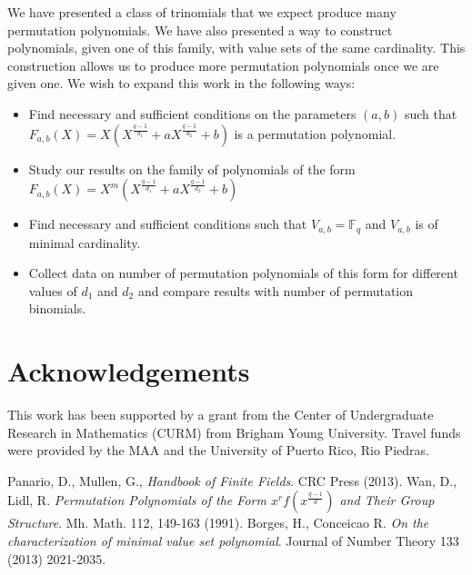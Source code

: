 \documentclass{article}
\theoremstyle{definition}
\theoremstyle{remark}
\numberwithin{equation}{section}
\begin{document}
    We have presented a class of trinomials that we expect produce many permutation polynomials. We have also presented a way to construct polynomials, given one of this family, with value sets of the same cardinality. This construction allows us to produce more permutation polynomials once we are given one. We wish to expand this work in the following ways:
    \begin{itemize}
    \item Find necessary and sufficient conditions on the parameters $(a,b)$ such that $F_{a,b}(X) = X(X^{\frac{q-1}{d_1}} + aX^{\frac{q-1}{d_2}} +b)$ is a permutation polynomial.
    \item Study our results on the family of polynomials of the form $F_{a,b}(X) = X^m(X^{\frac{q-1}{d_1}} + aX^{\frac{q-1}{d_2}} +b)$
    \item Find necessary and sufficient conditions such that $V_{a,b} = \mathbb{F}_q$ and $V_{a,b}$ is of minimal cardinality.
    \item Collect data on number of permutation polynomials of this form for different values of $d_1$ and $d_2$ and compare results with number of permutation binomials.
  \end{itemize}

\section{Acknowledgements}

  This work has been supported by a grant from the Center of Undergraduate Research in Mathematics (CURM) from Brigham Young University. Travel funds were provided by the MAA and the University of Puerto Rico, Rio Piedras.
 
\begin{thebibliography}{}
       Panario, D., Mullen, G., \textit{Handbook of Finite Fields}. CRC Press (2013).
       Wan, D., Lidl, R. \textit{Permutation Polynomials of the Form $x^{r}f(x^{\frac{q-1}{d}})$ and Their Group Structure}. Mh. Math. 112, 149-163 (1991).
       Borges, H., Conceicao R. \textit{On the characterization of minimal value set polynomial}. Journal of Number Theory 133 (2013) 2021-2035.
    \end{thebibliography}
\end{document}
